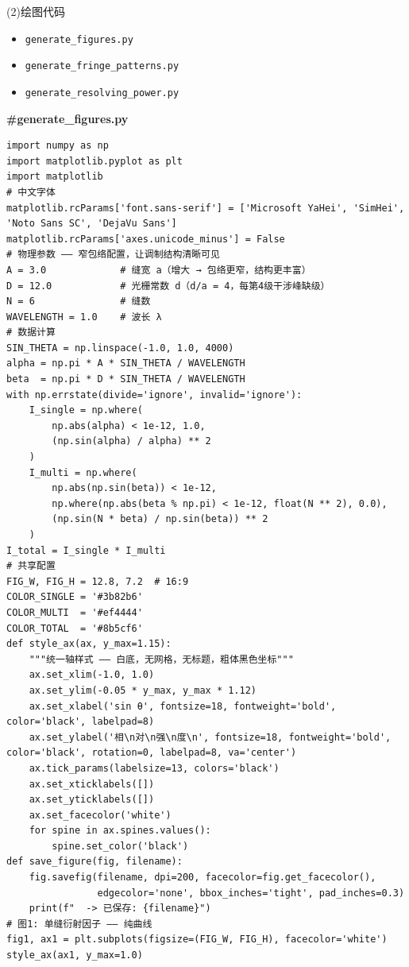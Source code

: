 \documentclass[12pt,a4paper]{ctexrep}
\begin{document}
\noindent (2)绘图代码

\begin{itemize}[leftmargin=2em, itemsep=0pt]
\item \texttt{generate\_figures.py}
\item \texttt{generate\_fringe\_patterns.py}
\item \texttt{generate\_resolving\_power.py}
\end{itemize}

\textbf{\#generate\_figures.py}

\begin{lstlisting}[style=pycode]
import numpy as np
import matplotlib.pyplot as plt
import matplotlib
# 中文字体
matplotlib.rcParams['font.sans-serif'] = ['Microsoft YaHei', 'SimHei', 'Noto Sans SC', 'DejaVu Sans']
matplotlib.rcParams['axes.unicode_minus'] = False
# 物理参数 —— 窄包络配置，让调制结构清晰可见
A = 3.0             # 缝宽 a（增大 → 包络更窄，结构更丰富）
D = 12.0            # 光栅常数 d（d/a = 4，每第4级干涉峰缺级）
N = 6               # 缝数
WAVELENGTH = 1.0    # 波长 λ
# 数据计算
SIN_THETA = np.linspace(-1.0, 1.0, 4000)
alpha = np.pi * A * SIN_THETA / WAVELENGTH
beta  = np.pi * D * SIN_THETA / WAVELENGTH
with np.errstate(divide='ignore', invalid='ignore'):
    I_single = np.where(
        np.abs(alpha) < 1e-12, 1.0,
        (np.sin(alpha) / alpha) ** 2
    )
    I_multi = np.where(
        np.abs(np.sin(beta)) < 1e-12,
        np.where(np.abs(beta % np.pi) < 1e-12, float(N ** 2), 0.0),
        (np.sin(N * beta) / np.sin(beta)) ** 2
    )
I_total = I_single * I_multi
# 共享配置
FIG_W, FIG_H = 12.8, 7.2  # 16:9
COLOR_SINGLE = '#3b82b6'
COLOR_MULTI  = '#ef4444'
COLOR_TOTAL  = '#8b5cf6'
def style_ax(ax, y_max=1.15):
    """统一轴样式 —— 白底，无网格，无标题，粗体黑色坐标"""
    ax.set_xlim(-1.0, 1.0)
    ax.set_ylim(-0.05 * y_max, y_max * 1.12)
    ax.set_xlabel('sin θ', fontsize=18, fontweight='bold', color='black', labelpad=8)
    ax.set_ylabel('相\n对\n强\n度\n', fontsize=18, fontweight='bold', color='black', rotation=0, labelpad=8, va='center')
    ax.tick_params(labelsize=13, colors='black')
    ax.set_xticklabels([])
    ax.set_yticklabels([])
    ax.set_facecolor('white')
    for spine in ax.spines.values():
        spine.set_color('black')
def save_figure(fig, filename):
    fig.savefig(filename, dpi=200, facecolor=fig.get_facecolor(),
                edgecolor='none', bbox_inches='tight', pad_inches=0.3)
    print(f"  -> 已保存: {filename}")
# 图1: 单缝衍射因子 —— 纯曲线
fig1, ax1 = plt.subplots(figsize=(FIG_W, FIG_H), facecolor='white')
style_ax(ax1, y_max=1.0)

\end{lstlisting}
\end{document}
